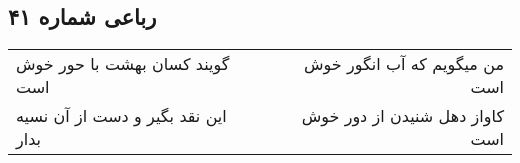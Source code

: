 \begin{center}
\section*{رباعی شماره ۴۱}
\label{sec:sh041}
\begin{longtable}{l p{0.5cm} r}
گویند کسان بهشت با حور خوش است
&&
من میگویم که آب انگور خوش است
\\
این نقد بگیر و دست از آن نسیه بدار
&&
کاواز دهل شنیدن از دور خوش است
\\
\end{longtable}
\end{center}
